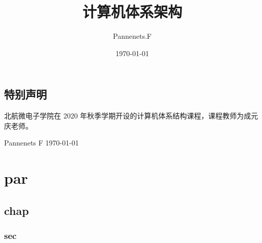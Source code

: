 \documentclass[cn,11pt,chinese,black,simple]{elegantbook}
\title{计算机体系架构}
\author{Pannenets.F}
\date{\today}
\begin{document}
\maketitle
\frontmatter

\chapter*{特别声明}

北航微电子学院在 2020 年秋季学期开设的计算机体系结构课程，课程教师为成元庆老师。

% 

\begin{flushright}
Pannenets F
\today
\end{flushright}

\tableofcontents

\mainmatter

\part{par}

\chapter{chap}

\section{sec}
\end{document}
